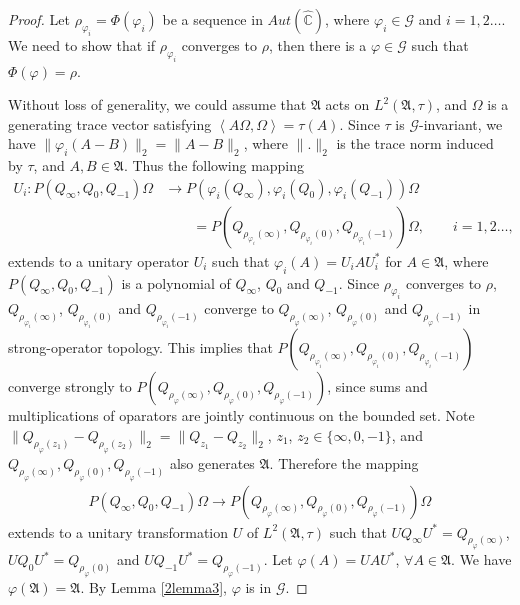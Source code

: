 \documentclass{amsart}
\newcommand{\AAA}{\mathfrak A}
\newcommand{\C}{\mathbb C} %
\begin{document}
\begin{proof}
Let $\rho_{\varphi_{i}} = \Phi(\varphi_{i})$ be a sequence in $Aut(\widehat{\C})$, where $\varphi_i \in \mathcal{G}$ and $i = 1, 2 \ldots$.
We need to show that if $\rho_{\varphi_{i}} $ converges to $\rho$, then there is a $\varphi \in  \mathcal{G}$ such that $\Phi(\varphi) = \rho$.

Without loss of generality, we could assume that $\AAA$ acts on $L^{2}(\AAA, \tau)$, 
and $\Omega$ is a generating trace vector satisfying $\left\langle A \Omega, \Omega \right \rangle = \tau(A)$. Since $\tau$ is $\mathcal{G}$-invariant, we have $\|\varphi_{i}(A -B) \|_2 = \| A - B \|_2$, where $\|. \|_2$ is the trace norm induced by $\tau$, and $A , B \in \AAA$.
Thus the following mapping 
\begin{align*}
U_{i}:  P(Q_{\infty}, Q_{0}, Q_{-1}) \Omega & \rightarrow P(\varphi_{i}(Q_{\infty}), \varphi_{i}(Q_{0}), \varphi_{i}(Q_{-1})) \Omega\\
& \qquad  = P(Q_{\rho_{\varphi_{i}}(\infty)}, Q_{\rho_{\varphi_{i}}(0)}, Q_{\rho_{\varphi_{i}}(-1)}) \Omega, \qquad i =  1, 2 \ldots ,
\end{align*}
extends to a unitary operator $U_i$ such that $\varphi_{i}(A) = U_{i}AU_{i}^{*}$ for
$A \in \AAA$, where $P(Q_{\infty}, Q_{0}, Q_{-1})$ is a polynomial of $Q_{\infty}$, $Q_{0}$ and $Q_{-1}$. Since $\rho_{\varphi_{i}}$ converges to $\rho$, $Q_{\rho_{\varphi_{i}}(\infty)}$, $Q_{\rho_{\varphi_{i}}(0)}$ and $Q_{\rho_{\varphi_{i}}(-1)}$
converge to $Q_{\rho_{\varphi}(\infty)}$, $Q_{\rho_{\varphi}(0)}$ and $Q_{\rho_{\varphi}(-1)}$ in strong-operator topology. This implies that $P(Q_{\rho_{\varphi_{i}}(\infty)}, Q_{\rho_{\varphi_{i}}(0)}, Q_{\rho_{\varphi_{i}}(-1)})$ converge strongly to $P(Q_{\rho_{\varphi}(\infty)}, Q_{\rho_{\varphi}(0)}, Q_{\rho_{\varphi}(-1)})$, since sums and multiplications of oparators are jointly continuous on the bounded set. 
Note $\|Q_{\rho_{\varphi}(z_1)} -  Q_{\rho_{\varphi}(z_2)}\|_2 = \|Q_{z_1} - Q_{z_2} \|_{2}$, $z_1$, $z_2 \in \{ \infty, 0, -1 \}$, and $Q_{\rho_{\varphi}(\infty)}, Q_{\rho_{\varphi}(0)}, Q_{\rho_{\varphi}(-1)}$ also generates $\AAA$. 
Therefore the mapping 
\begin{align*}
P(Q_{\infty}, Q_{0}, Q_{-1}) \Omega  \rightarrow  P(Q_{\rho_{\varphi}(\infty)}, Q_{\rho_{\varphi}(0)}, Q_{\rho_{\varphi}(-1)}) \Omega
\end{align*}
extends to a unitary transformation $U$ of $L^{2}(\AAA, \tau)$ such that 
$UQ_{\infty}U^{*}  = Q_{\rho_{\varphi}(\infty)}$, $UQ_{0}U^{*}  = Q_{\rho_{\varphi}(0)}$ and 
$UQ_{-1}U^{*}  = Q_{\rho_{\varphi}(-1)}$. Let $\varphi(A) = UAU^{*}$, $\forall A \in \AAA$.
We have $\varphi(\AAA) = \AAA$. By Lemma \ref{2lemma3}, $\varphi$ is in $\mathcal{G}$.


\end{proof}
\end{document}
